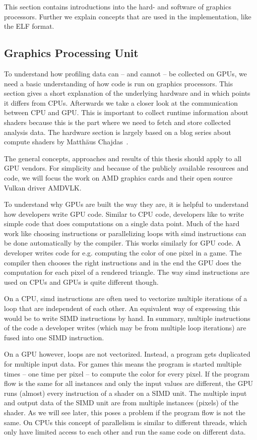 \clearpage
{}
This section contains introductions into the hard- and software of graphics processors. Further we explain concepts that are used in the implementation, like the ELF format.

\subsection{Graphics Processing Unit}
To understand how profiling data can -- and cannot -- be collected on GPUs, we need a basic understanding of how code is run on graphics processors. This section gives a short explanation of the underlying hardware and in which points it differs from CPUs.
Afterwards we take a closer look at the communication between CPU and GPU. This is important to collect runtime information about shaders because this is the part where we need to fetch and store collected analysis data. The hardware section is largely based on a blog series about compute shaders by Matthäus Chajdas~\cite{Chajdas2018}.

The general concepts, approaches and results of this thesis should apply to all GPU vendors. For simplicity and because of the publicly available resources and code, we will focus the work on AMD graphics cards and their open source Vulkan driver AMDVLK.

To understand why GPUs are built the way they are, it is helpful to understand how developers write GPU code. Similar to CPU code, developers like to write simple code that does computations on a single data point. Much of the hard work like choosing instructions or parallelizing loops with \gls{simd} instructions can be done automatically by the compiler. This works similarly for GPU code. A developer writes code for e.g. computing the color of one pixel in a game. The compiler then chooses the right instructions and in the end the GPU does the computation for each pixel of a rendered triangle. The way \gls{simd} instructions are used on CPUs and GPUs is quite different though.

On a CPU, \gls{simd} instructions are often used to vectorize multiple iterations of a loop that are independent of each other. An equivalent way of expressing this would be to write SIMD instructions by hand. In summary, multiple instructions of the code a developer writes (which may be from multiple loop iterations) are fused into one SIMD instruction.

On a GPU however, loops are not vectorized. Instead, a program gets duplicated for multiple input data. For games this means the program is started multiple times -- one time per pixel -- to compute the color for every pixel. If the program flow is the same for all instances and only the input values are different, the GPU runs (almost) every instruction of a shader on a SIMD unit. The multiple input and output data of the SIMD unit are from multiple instances (pixels) of the shader. As we will see later, this poses a problem if the program flow is not the same. On CPUs this concept of parallelism is similar to different threads, which only have limited access to each other and run the same code on different data.

